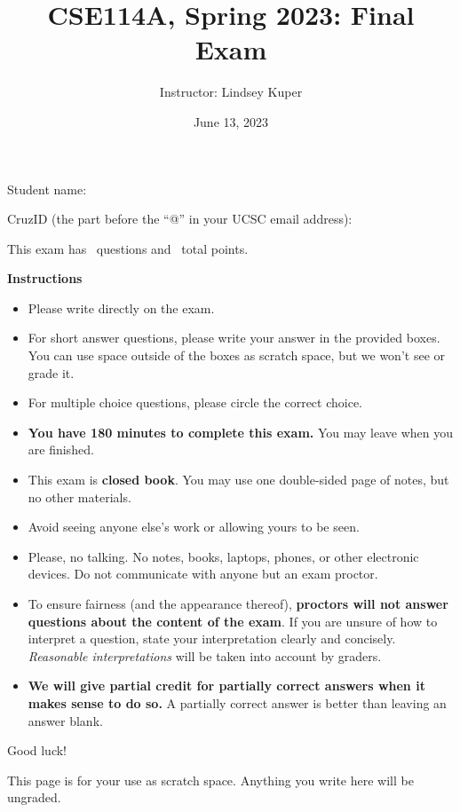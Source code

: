\documentclass[addpoints]{exam}
\title{CSE114A, Spring 2023: Final Exam}
\author{Instructor: Lindsey Kuper}
\date{June 13, 2023}
\begin{document}
\maketitle

\begin{coverpages}

\bigskip  

\noindent Student name: \hrulefill

\bigskip
\bigskip

\noindent CruzID (the part before the ``@'' in your UCSC email address): \hrulefill

\bigskip
\bigskip

\noindent This exam has \numquestions~questions and \numpoints~total points.

\bigskip
\bigskip

\noindent \textbf{Instructions}

\begin{itemize}
\item Please write directly on the exam.
\item For short answer questions, please write your answer in the provided boxes.  You can use space outside of the boxes as scratch space, but we won't see or grade it.
\item For multiple choice questions, please circle the correct choice.
\item \textbf{You have 180 minutes to complete this exam.} You may leave when you are finished.
\item This exam is \textbf{closed book}.  You may use one double-sided page of notes, but no other materials.
\item Avoid seeing anyone else's work or allowing yours to be seen.
\item Please, no talking.  No notes, books, laptops, phones, or other electronic devices. Do not communicate with anyone but an exam proctor.
\item To ensure fairness (and the appearance thereof),
  \textbf{proctors will not answer questions about the content of the exam}. If you are unsure 
  of how to interpret a question, state your interpretation clearly and concisely. 
  \textit{Reasonable interpretations} will be taken into account by graders.
\item \textbf{We will give partial credit for partially correct answers when it makes sense to do so.} A partially correct answer is better than leaving an answer blank.
\end{itemize}
  
\bigskip

\noindent Good luck!

\newpage

This page is for your use as scratch space. Anything you write here will be ungraded.

\newpage  

\end{coverpages}
\end{document}
